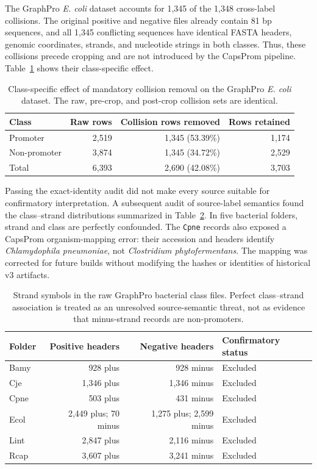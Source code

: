 The GraphPro \textit{E. coli} dataset accounts for 1,345 of the 1,348
cross-label collisions. The original positive and negative files already
contain 81 bp sequences, and all 1,345 conflicting sequences have identical
FASTA headers, genomic coordinates, strands, and nucleotide strings in both
classes. Thus, these collisions precede cropping and are not introduced by the
CapsProm pipeline. Table~\ref{tab:results-graphpro-ecoli-filtering} shows their
class-specific effect.

\begin{table}[htbp]
  \centering
  \caption{Class-specific effect of mandatory collision removal on the GraphPro \textit{E. coli} dataset. The raw, pre-crop, and post-crop collision sets are identical.}
  \label{tab:results-graphpro-ecoli-filtering}
  \begin{tabular}{lrrr}
    \toprule
    Class & Raw rows & Collision rows removed & Rows retained \\
    \midrule
    Promoter & 2,519 & 1,345 (53.39\%) & 1,174 \\
    Non-promoter & 3,874 & 1,345 (34.72\%) & 2,529 \\
    \midrule
    Total & 6,393 & 2,690 (42.08\%) & 3,703 \\
    \bottomrule
  \end{tabular}
\end{table}

Passing the exact-identity audit did not make every source suitable for
confirmatory interpretation. A subsequent audit of source-label semantics found
the class--strand distributions summarized in
Table~\ref{tab:results-graphpro-source-label-semantics}. In five bacterial
folders, strand and class are perfectly confounded. The \texttt{Cpne} records
also exposed a CapsProm organism-mapping error: their accession and headers
identify \textit{Chlamydophila pneumoniae}, not \textit{Clostridium
phytofermentans}. The mapping was corrected for future builds without modifying
the hashes or identities of historical v3 artifacts.

\begin{table}[htbp]
  \centering
  \caption{Strand symbols in the raw GraphPro bacterial class files. Perfect
  class--strand association is treated as an unresolved source-semantic threat,
  not as evidence that minus-strand records are non-promoters.}
  \label{tab:results-graphpro-source-label-semantics}
  \begin{tabular}{lrrl}
    \toprule
    Folder & Positive headers & Negative headers & Confirmatory status \\
    \midrule
    Bamy & 928 plus & 928 minus & Excluded \\
    Cje & 1,346 plus & 1,346 minus & Excluded \\
    Cpne & 503 plus & 431 minus & Excluded \\
    Ecol & 2,449 plus; 70 minus & 1,275 plus; 2,599 minus & Excluded \\
    Lint & 2,847 plus & 2,116 minus & Excluded \\
    Rcap & 3,607 plus & 3,241 minus & Excluded \\
    \bottomrule
  \end{tabular}
\end{table}

